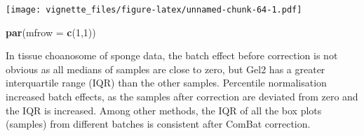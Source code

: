 \documentclass[]{book}
\newenvironment{Shaded}{\begin{snugshade}}{\end{snugshade}}
\newcommand{\KeywordTok}[1]{\textcolor[rgb]{0.13,0.29,0.53}{\textbf{#1}}}
\newcommand{\DataTypeTok}[1]{\textcolor[rgb]{0.13,0.29,0.53}{#1}}
\newcommand{\DecValTok}[1]{\textcolor[rgb]{0.00,0.00,0.81}{#1}}
\newcommand{\NormalTok}[1]{#1}
\begin{document}
\texttt{[image: vignette\_files/figure-latex/unnamed-chunk-64-1.pdf]}

\begin{Shaded}
\begin{Highlighting}[]
\KeywordTok{par}\NormalTok{(}\DataTypeTok{mfrow =} \KeywordTok{c}\NormalTok{(}\DecValTok{1}\NormalTok{,}\DecValTok{1}\NormalTok{))}
\end{Highlighting}
\end{Shaded}

In tissue choanosome of sponge data, the batch effect before correction
is not obvious as all medians of samples are close to zero, but Gel2 has
a greater interquartile range (IQR) than the other samples. Percentile
normalisation increased batch effects, as the samples after correction
are deviated from zero and the IQR is increased. Among other methods,
the IQR of all the box plots (samples) from different batches is
consistent after ComBat correction.
\end{document}
